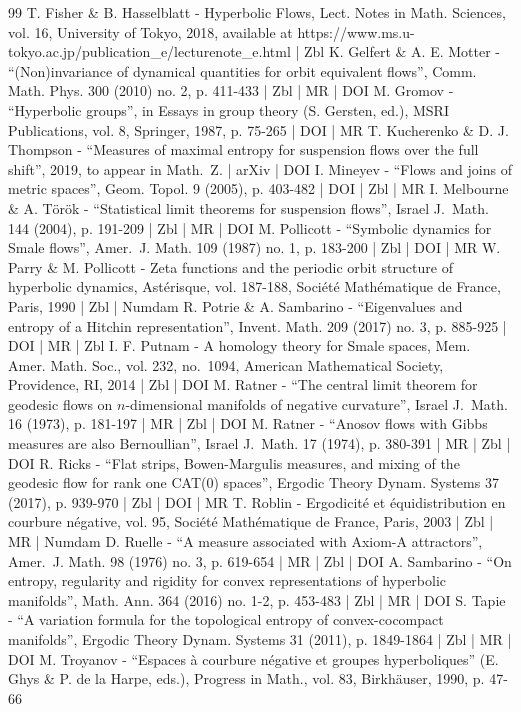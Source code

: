 \documentclass[10pt]{amsart}
\theoremstyle{definition}
\numberwithin{equation}{section}
\begin{document}
\begin{thebibliography}{99}
T. Fisher \& B. Hasselblatt - Hyperbolic Flows, Lect. Notes in Math. Sciences, vol. 16, University of Tokyo, 2018, available at https://www.ms.u-tokyo.ac.jp/publication\_e/lecturenote\_e.html | Zbl
K. Gelfert \& A. E. Motter - “(Non)invariance of dynamical quantities for orbit equivalent flows”, Comm. Math. Phys. 300 (2010) no. 2, p. 411-433 | Zbl | MR | DOI
M. Gromov - “Hyperbolic groups”, in Essays in group theory (S. Gersten, ed.), MSRI Publications, vol. 8, Springer, 1987, p. 75-265 | DOI | MR
T. Kucherenko \& D. J. Thompson - “Measures of maximal entropy for suspension flows over the full shift”, 2019, to appear in Math. Z. | arXiv | DOI
I. Mineyev - “Flows and joins of metric spaces”, Geom. Topol. 9 (2005), p. 403-482 | DOI | Zbl | MR
I. Melbourne \& A. Török - “Statistical limit theorems for suspension flows”, Israel J. Math. 144 (2004), p. 191-209 | Zbl | MR | DOI
M. Pollicott - “Symbolic dynamics for Smale flows”, Amer. J. Math. 109 (1987) no. 1, p. 183-200 | Zbl | DOI | MR
W. Parry \& M. Pollicott - Zeta functions and the periodic orbit structure of hyperbolic dynamics, Astérisque, vol. 187-188, Société Mathématique de France, Paris, 1990 | Zbl | Numdam
R. Potrie \& A. Sambarino - “Eigenvalues and entropy of a Hitchin representation”, Invent. Math. 209 (2017) no. 3, p. 885-925 | DOI | MR | Zbl
I. F. Putnam - A homology theory for Smale spaces, Mem. Amer. Math. Soc., vol. 232, no. 1094, American Mathematical Society, Providence, RI, 2014 | Zbl | DOI
M. Ratner - “The central limit theorem for geodesic flows on $n$-dimensional manifolds of negative curvature”, Israel J. Math. 16 (1973), p. 181-197 | MR | Zbl | DOI
M. Ratner - “Anosov flows with Gibbs measures are also Bernoullian”, Israel J. Math. 17 (1974), p. 380-391 | MR | Zbl | DOI
R. Ricks - “Flat strips, Bowen-Margulis measures, and mixing of the geodesic flow for rank one CAT(0) spaces”, Ergodic Theory Dynam. Systems 37 (2017), p. 939-970 | Zbl | DOI | MR
T. Roblin - Ergodicité et équidistribution en courbure négative, vol. 95, Société Mathématique de France, Paris, 2003 | Zbl | MR | Numdam
D. Ruelle - “A measure associated with Axiom-A attractors”, Amer. J. Math. 98 (1976) no. 3, p. 619-654 | MR | Zbl | DOI
A. Sambarino - “On entropy, regularity and rigidity for convex representations of hyperbolic manifolds”, Math. Ann. 364 (2016) no. 1-2, p. 453-483 | Zbl | MR | DOI
S. Tapie - “A variation formula for the topological entropy of convex-cocompact manifolds”, Ergodic Theory Dynam. Systems 31 (2011), p. 1849-1864 | Zbl | MR | DOI
M. Troyanov - “Espaces à courbure négative et groupes hyperboliques” (E. Ghys \& P. de la Harpe, eds.), Progress in Math., vol. 83, Birkhäuser, 1990, p. 47-66
\end{thebibliography}
\end{document}
